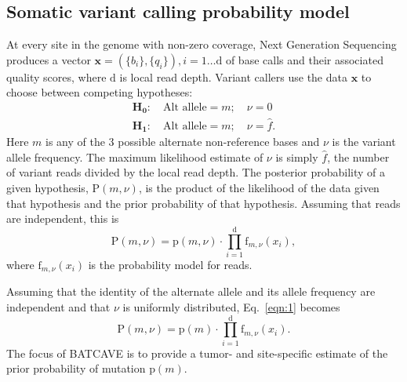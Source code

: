 \documentclass[a4,center,fleqn]{NAR}
\newcommand{\batcave}{BATCAVE }
\begin{document}
\subsection{Somatic variant calling probability model}

At every site in the genome with non-zero coverage, Next Generation Sequencing produces a vector $\mathbf{x}  = (\{b_i\},\{q_i\}), i = 1\dots \mathrm{d}$ of base calls and their associated quality scores, where $\mathrm{d}$ is local read depth.
Variant callers use the data $\mathbf{x}$ to choose between competing hypotheses:
\begin{equation}
  \label{eqn:hypothesis}
  \begin{array}{l}
    \mathbf{H_0}:\quad \textrm{Alt allele} = m;\quad\nu = 0\\
    \mathbf{H_1}:\quad \textrm{Alt allele} = m;\quad\nu = \hat{f}.
  \end{array}
\end{equation}
Here $m$ is any of the 3 possible alternate non-reference bases and $\nu$ is the variant allele frequency.
The maximum likelihood estimate of $\nu$ is simply $\hat{f}$, the number of variant reads divided by the local read depth.
The posterior probability of a given hypothesis, $\mathrm{P}(m,\nu)$, is the product of the likelihood of the data given that hypothesis and the prior probability of that hypothesis. 
Assuming that reads are independent, this is
\begin{equation}\label{eqn:1}
  \mathrm{P}(m,\nu) = \mathrm{p}(m,\nu) \cdot \prod_{i=1}^{\mathrm{d}} \textrm{f}_{m,\nu}(x_i),
\end{equation}
where $\textrm{f}_{m,\nu}(x_i)$ is the probability model for reads.

Assuming that the identity of the alternate allele and its allele frequency are independent and that $\nu$ is uniformly distributed, Eq.~\ref{eqn:1} becomes
\begin{equation}  \label{eqn:2}
  \mathrm{P}(m,\nu) = \mathrm{p}(m) \cdot \prod_{i=1}^{\mathrm{d}} \textrm{f}_{m,\nu}(x_i).
\end{equation}
The focus of \batcave is to provide a tumor- and site-specific estimate of the prior probability of mutation $\mathrm{p}(m)$.
\end{document}
